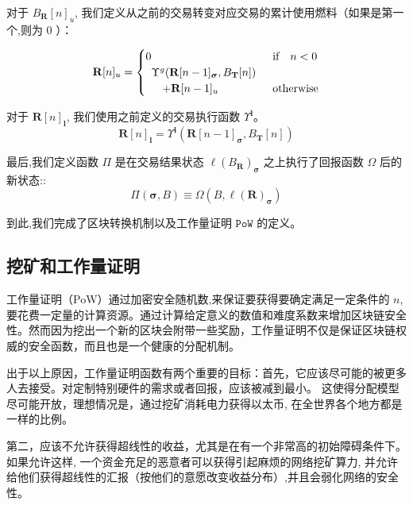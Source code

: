 \documentclass[9pt,oneside]{amsart}
\begin{document}
\begin{multicols}{2}
对于 $B_\mathbf{R}[n]_u$, 我们定义从之前的交易转变对应交易的累计使用燃料（如果是第一个,则为 0 ）：

\begin{equation}
\mathbf{R}[n]_u = \begin{cases} 0 & \text{if} \quad n < 0 \\
\begin{array}[b]{l}
\Upsilon^g(\mathbf{R}[n - 1]_{\boldsymbol{\sigma}}, B_\mathbf{T}[n])\\ \quad + \mathbf{R}[n-1]_u
\end{array}
 & \text{otherwise} \end{cases}
\end{equation}

对于 $\mathbf{R}[n]_\mathbf{l}$, 我们使用之前定义的交易执行函数 $\Upsilon^\mathbf{l}$。
\begin{equation}
\mathbf{R}[n]_\mathbf{l} =
\Upsilon^\mathbf{l}(\mathbf{R}[n - 1]_{\boldsymbol{\sigma}}, B_\mathbf{T}[n])
\end{equation}

最后,我们定义函数 $\Pi$ 是在交易结果状态 $\ell(B_\mathbf{R})_{\boldsymbol{\sigma}}$ 之上执行了回报函数  $\Omega$ 后的新状态::
\begin{equation}
\Pi(\boldsymbol{\sigma}, B) \equiv \Omega(B, \ell(\mathbf{R})_{\boldsymbol{\sigma}})
\end{equation}

到此,我们完成了区块转换机制以及工作量证明 $\mathtt{PoW}$ 的定义。

\subsection{挖矿和工作量证明} \label{ch:pow}

工作量证明（PoW）通过加密安全随机数,来保证要获得要确定满足一定条件的 $n$,要花费一定量的计算资源。通过计算给定意义的数值和难度系数来增加区块链安全性。然而因为挖出一个新的区块会附带一些奖励，工作量证明不仅是保证区块链权威的安全函数，而且也是一个健康的分配机制。

出于以上原因，工作量证明函数有两个重要的目标：首先，它应该尽可能的被更多人去接受。对定制特别硬件的需求或者回报，应该被减到最小。 这使得分配模型尽可能开放，理想情况是，通过挖矿消耗电力获得以太币, 在全世界各个地方都是一样的比例。

第二，应该不允许获得超线性的收益，尤其是在有一个非常高的初始障碍条件下。如果允许这样, 一个资金充足的恶意者可以获得引起麻烦的网络挖矿算力, 并允许给他们获得超线性的汇报（按他们的意愿改变收益分布）,并且会弱化网络的安全性。


\end{multicols}
\end{document}
